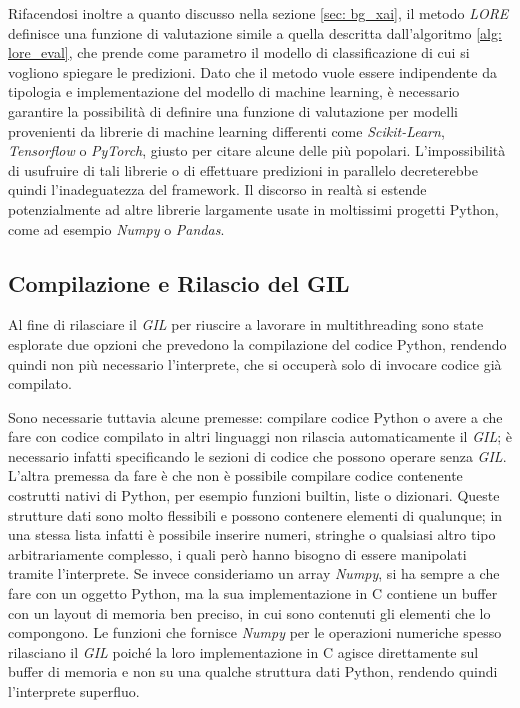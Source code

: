 Rifacendosi inoltre a quanto discusso nella sezione \ref{sec: bg_xai}, il metodo
\textit{LORE} definisce una funzione di valutazione simile a quella descritta
dall'algoritmo \ref{alg: lore_eval}, che prende come parametro il modello di
classificazione di cui si vogliono spiegare le predizioni. Dato che il metodo
vuole essere indipendente da tipologia e implementazione del modello di machine
learning, è necessario garantire la possibilità di definire una funzione di
valutazione per modelli provenienti da librerie di machine learning differenti
come \textit{Scikit-Learn}, \textit{Tensorflow} o \textit{PyTorch}, giusto per
citare alcune delle più popolari. L'impossibilità di usufruire di tali librerie
o di effettuare predizioni in parallelo decreterebbe quindi l'inadeguatezza del
framework. Il discorso in realtà si estende potenzialmente ad altre librerie
largamente usate in moltissimi progetti Python, come ad esempio \textit{Numpy}
o \textit{Pandas}.

\subsection{Compilazione e Rilascio del GIL}

Al fine di rilasciare il \textit{GIL} per riuscire a lavorare in multithreading
sono state esplorate due opzioni che prevedono la compilazione del codice
Python, rendendo quindi non più necessario l'interprete, che si occuperà solo
di invocare codice già compilato.

Sono necessarie tuttavia alcune premesse: compilare codice Python o avere a che
fare con codice compilato in altri linguaggi non rilascia automaticamente il
\textit{GIL}; è necessario infatti specificando le sezioni di codice che possono
operare senza \textit{GIL}. L'altra premessa da fare è che non è possibile
compilare codice contenente costrutti nativi di Python, per esempio funzioni
builtin, liste o dizionari. Queste strutture dati sono molto flessibili e
possono contenere elementi di qualunque; in una stessa lista infatti è possibile
inserire numeri, stringhe o qualsiasi altro tipo arbitrariamente complesso, i
quali però hanno bisogno di essere manipolati tramite l'interprete. Se invece
consideriamo un array \textit{Numpy}, si ha sempre a che fare con un oggetto
Python, ma la sua implementazione in C contiene un buffer con un layout di
memoria ben preciso, in cui sono contenuti gli elementi che lo compongono. Le
funzioni che fornisce \textit{Numpy} per le operazioni numeriche spesso
rilasciano il \textit{GIL} poiché la loro implementazione in C agisce
direttamente sul buffer di memoria e non su una qualche struttura dati Python,
rendendo quindi l'interprete superfluo.

